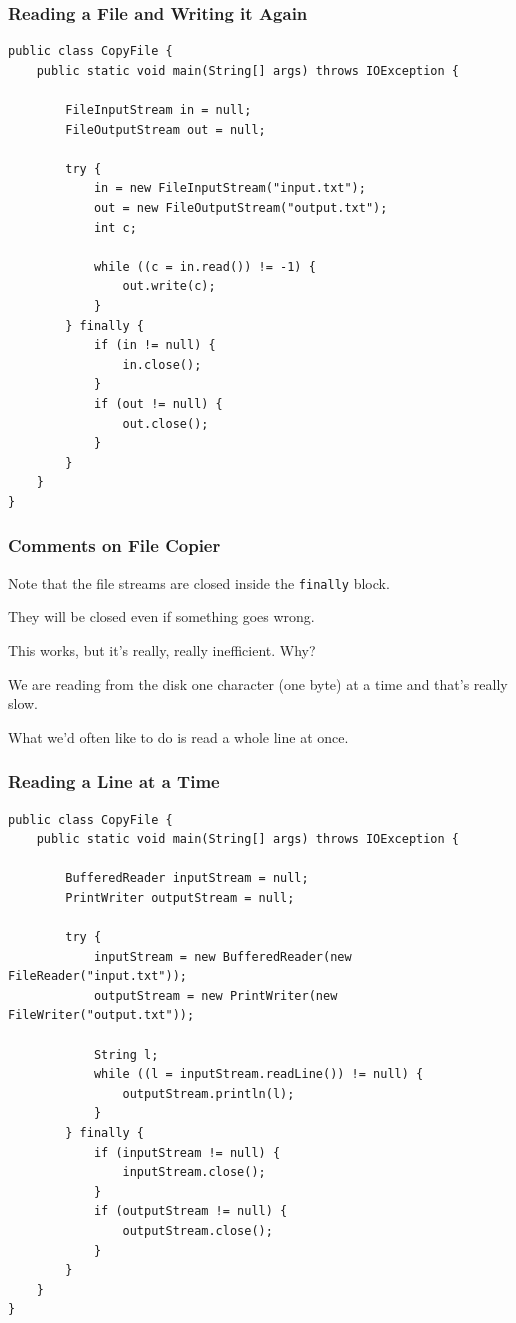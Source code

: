 \begin{frame}[fragile]
\frametitle{Reading a File and Writing it Again}
\begin{changemargin}{1cm}
{\scriptsize
\begin{verbatim}
public class CopyFile {
    public static void main(String[] args) throws IOException {

        FileInputStream in = null;
        FileOutputStream out = null;

        try {
            in = new FileInputStream("input.txt");
            out = new FileOutputStream("output.txt");
            int c;

            while ((c = in.read()) != -1) {
                out.write(c);
            }
        } finally {
            if (in != null) {
                in.close();
            }
            if (out != null) {
                out.close();
            }
        }
    }
}
\end{verbatim}
}
\end{changemargin}
\end{frame}

\begin{frame}
\frametitle{Comments on File Copier}
\begin{changemargin}{1cm}

Note that the file streams are closed inside the \texttt{finally} block.

They will be closed even if something goes wrong. 

This works, but it's really, really inefficient. Why? 

We are reading from the disk one character (one byte) at a time and that's really slow. 

What we'd often like to do is read a whole line at once. 

\end{changemargin}
\end{frame}

\begin{frame}[fragile]
\frametitle{Reading a Line at a Time}
\begin{changemargin}{1cm}
{\scriptsize
\begin{verbatim}
public class CopyFile {
    public static void main(String[] args) throws IOException {

        BufferedReader inputStream = null;
        PrintWriter outputStream = null;

        try {
            inputStream = new BufferedReader(new FileReader("input.txt"));
            outputStream = new PrintWriter(new FileWriter("output.txt"));

            String l;
            while ((l = inputStream.readLine()) != null) {
                outputStream.println(l);
            }
        } finally {
            if (inputStream != null) {
                inputStream.close();
            }
            if (outputStream != null) {
                outputStream.close();
            }
        }
    }
}
\end{verbatim}
}

\end{changemargin}
\end{frame}

